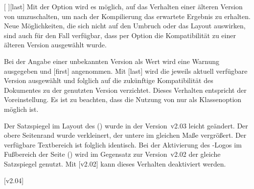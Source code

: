 \begin{Declaration}[v2.03]{[%
  \textOR{}\textOR{}%
]}[last]
\printdeclarationlist%
%
%
Mit der Option  wird es möglich, auf das Verhalten einer 
älteren Version von \TUDScript umzuschalten, um nach der Kompilierung das 
erwartete Ergebnis zu erhalten. Neue Möglichkeiten, die sich nicht auf den 
Umbruch oder das Layout auswirken, sind auch für den Fall verfügbar, dass per 
Option die Kompatibilität zu einer älteren Version ausgewählt wurde. 

Bei der Angabe einer unbekannten Version als Wert wird eine Warnung ausgegeben 
und [first] angenommen. Mit [last] wird die 
jeweils aktuell verfügbare Version ausgewählt und folglich auf die zukünftige 
Kompatibilität des Dokumentes zu der genutzten Version verzichtet. Dieses 
Verhalten entspricht der Voreinstellung. Es ist zu beachten, dass die Nutzung 
von  nur als Klassenoption möglich ist.
%
\begin{values}
\item[\PValue{v2.02}\textOR\PValue{last}]
  Der Satzspiegel im Layout des \CDs () wurde in der 
  Version~v2.03 leicht geändert. Der obere Seitenrand wurde verkleinert, der 
  untere im gleichen Maße vergrößert. Der verfügbare Textbereich ist folglich 
  identisch. Bei der Aktivierung des \DDC-Logos im Fußbereich der Seite
  () wird im Gegensatz zur Version~v2.02 der gleiche 
  Satzspiegel genutzt. Mit [v2.02] kann dieses Verhalten 
  deaktiviert werden.
\end{values}
\end{Declaration}

[v2.04]